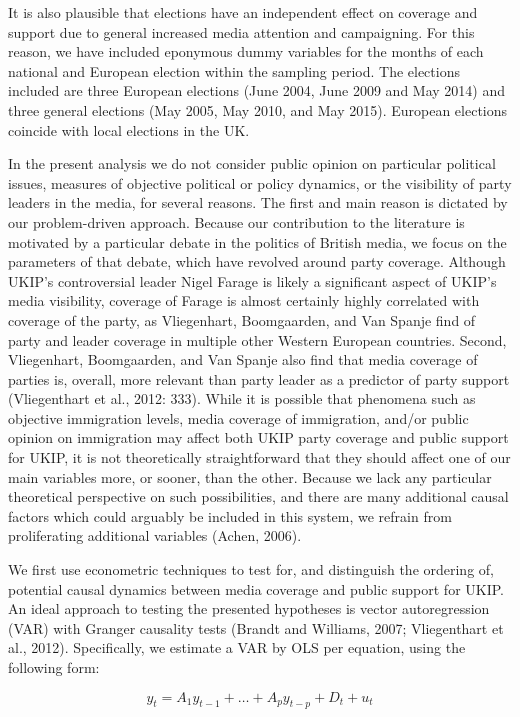 \documentclass[12pt,article]{article}
\begin{document}
It is also plausible that elections have an independent effect on
coverage and support due to general increased media attention and
campaigning. For this reason, we have included eponymous dummy variables
for the months of each national and European election within the
sampling period. The elections included are three European elections
(June 2004, June 2009 and May 2014) and three general elections (May
2005, May 2010, and May 2015). European elections coincide with local
elections in the UK.

In the present analysis we do not consider public opinion on particular
political issues, measures of objective political or policy dynamics, or
the visibility of party leaders in the media, for several reasons. The
first and main reason is dictated by our problem-driven approach.
Because our contribution to the literature is motivated by a particular
debate in the politics of British media, we focus on the parameters of
that debate, which have revolved around party coverage. Although UKIP's
controversial leader Nigel Farage is likely a significant aspect of
UKIP's media visibility, coverage of Farage is almost certainly highly
correlated with coverage of the party, as Vliegenhart, Boomgaarden, and
Van Spanje find of party and leader coverage in multiple other Western
European countries. Second, Vliegenhart, Boomgaarden, and Van Spanje
also find that media coverage of parties is, overall, more relevant than
party leader as a predictor of party support (Vliegenthart et al., 2012:
333). While it is possible that phenomena such as objective immigration
levels, media coverage of immigration, and/or public opinion on
immigration may affect both UKIP party coverage and public support for
UKIP, it is not theoretically straightforward that they should affect
one of our main variables more, or sooner, than the other. Because we
lack any particular theoretical perspective on such possibilities, and
there are many additional causal factors which could arguably be
included in this system, we refrain from proliferating additional
variables (Achen, 2006).

We first use econometric techniques to test for, and distinguish the
ordering of, potential causal dynamics between media coverage and public
support for UKIP. An ideal approach to testing the presented hypotheses
is vector autoregression (VAR) with Granger causality tests (Brandt and
Williams, 2007; Vliegenthart et al., 2012). Specifically, we estimate a
VAR by OLS per equation, using the following form:

\begin{equation}
 \label{eq:VAR}
    y_t = A_1 y_{t-1} + … + A_p y_{t-p} + D_t + u_t
\end{equation}
\end{document}
